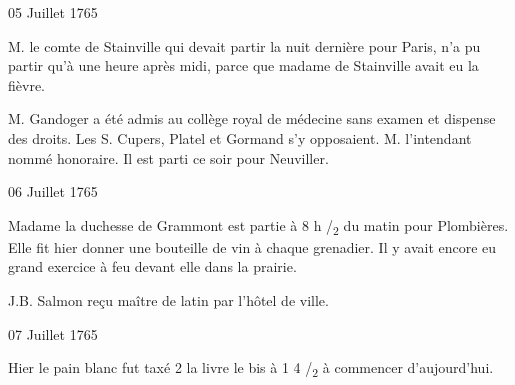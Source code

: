                      \begin{diary}{05 Juillet 1765}{}


                           M. le comte de Stainville qui
                           devait partir
                           la nuit dernière pour Paris,
                           n'a pu partir
                           qu'à une heure après midi, parce que madame
                              de Stainville avait eu la fièvre. \bigskip



                           M. Gandoger a été admis au collège royal
                              de médecine sans examen et dispense des
                           droits. Les S.
                           Cupers, Platel et Gormand
                           s'y opposaient. M. l'intendant nommé
                           honoraire. Il est parti ce soir pour Neuviller. \bigskip


                     \end{diary}

                     \begin{diary}{06 Juillet 1765}{}


                           Madame la duchesse de Grammont est partie
                           à 8 h /\textsubscript{2} du matin pour
                              Plombières.
                           Elle fit hier donner une bouteille de vin
                           à chaque grenadier. Il y avait encore
                           eu grand exercice à feu devant elle
                           dans la prairie. \bigskip



                           J.B. Salmon reçu maître de latin par
                           l'hôtel de ville. \bigskip


                     \end{diary}




                     \begin{diary}{07 Juillet 1765}{}

                         Hier le pain blanc fut taxé 2 la livre
                           le bis à 1 4
                           /\textsubscript{2} à commencer d'aujourd'hui.
                        \bigskip


                     \end{diary}

